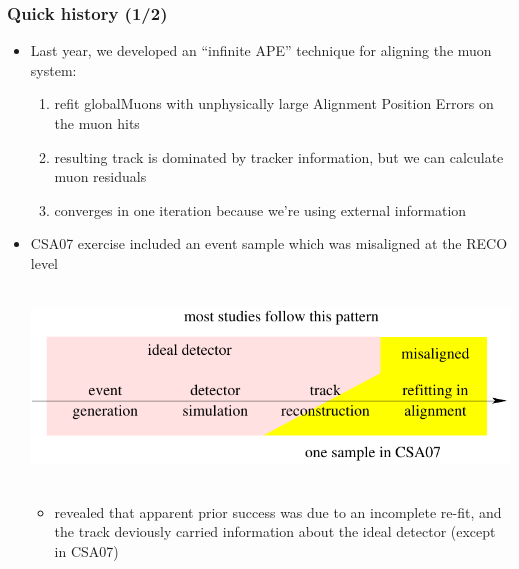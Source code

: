 \documentclass[compress]{beamer}
\begin{document}
\begin{frame}
\frametitle{Quick history (1/2)}

\small
\begin{itemize}
\item Last year, we developed an ``infinite APE'' technique for
aligning the muon system:
\begin{enumerate}
\item refit globalMuons with unphysically large Alignment Position Errors on the muon hits
\item resulting track is dominated by tracker information, but we can calculate muon residuals
\item converges in one iteration because we're using external information
\end{enumerate}
\item CSA07 exercise included an event sample which was misaligned at the RECO level

\mbox{ } \hfill \includegraphics[width=0.6\linewidth]{misal_at_reco.pdf} \hfill \mbox{ }

\begin{itemize}
\item revealed that apparent prior success was due to an incomplete
re-fit, and the track deviously carried information about the ideal detector (except in CSA07)
\end{itemize}
\end{itemize}
\end{frame}
\end{document}

